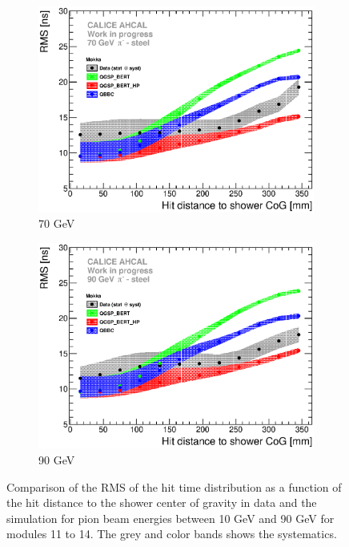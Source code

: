\begin{figure}[htbp!]
  \begin{subfigure}[t]{0.49\textwidth}
    \centering
    \includegraphics[width=1\textwidth]{../Thesis_Plots/Timing/Pions/Plots/ComparisonToSim/RMS_Radius_70GeV_BL_Mokka.eps}
    \caption{70 GeV}\label{fig:Radius_BL_RMS_SimData_70GeV}
  \end{subfigure}
  \hfill
  \begin{subfigure}[t]{0.49\textwidth}
    \centering
    \includegraphics[width=1\textwidth]{../Thesis_Plots/Timing/Pions/Plots/ComparisonToSim/RMS_Radius_90GeV_BL_Mokka.eps}
    \caption{90 GeV}\label{fig:Radius_BL_RMS_SimData_90GeV}
  \end{subfigure}
  \caption{Comparison of the RMS of the hit time distribution as a function of the hit distance to the shower center of gravity in data and the \mokka simulation for pion beam energies between 10 GeV and 90 GeV for modules 11 to 14. The grey and color bands shows the systematics.}
  \label{fig:Radius_BL_RMS_SimData_Comparison_Mokka}
\end{figure}

